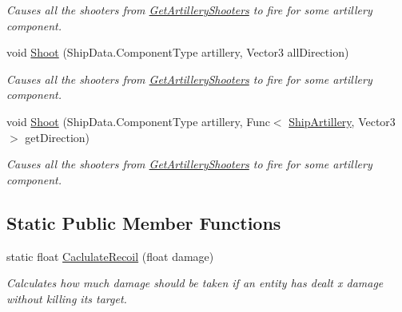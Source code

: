 \begin{DoxyCompactItemize}
\begin{DoxyCompactList}\small\item\em Causes all the shooters from \hyperlink{class_skyrates_1_1_entity_1_1_entity_ship_a75c4b113dd48dba91c0abaaa1372ed1a}{Get\-Artillery\-Shooters} to fire for some artillery component. \end{DoxyCompactList}\item 
void \hyperlink{class_skyrates_1_1_entity_1_1_entity_ship_a5a6db8ceccf49166e10794393d5100a4}{Shoot} (Ship\-Data.\-Component\-Type artillery, Vector3 all\-Direction)
\begin{DoxyCompactList}\small\item\em Causes all the shooters from \hyperlink{class_skyrates_1_1_entity_1_1_entity_ship_a75c4b113dd48dba91c0abaaa1372ed1a}{Get\-Artillery\-Shooters} to fire for some artillery component. \end{DoxyCompactList}\item 
void \hyperlink{class_skyrates_1_1_entity_1_1_entity_ship_a53c071ec06053fda9744f40cfa1e2481}{Shoot} (Ship\-Data.\-Component\-Type artillery, Func$<$ \hyperlink{class_skyrates_1_1_ship_1_1_ship_artillery}{Ship\-Artillery}, Vector3 $>$ get\-Direction)
\begin{DoxyCompactList}\small\item\em Causes all the shooters from \hyperlink{class_skyrates_1_1_entity_1_1_entity_ship_a75c4b113dd48dba91c0abaaa1372ed1a}{Get\-Artillery\-Shooters} to fire for some artillery component. \end{DoxyCompactList}\end{DoxyCompactItemize}
\subsection*{Static Public Member Functions}
\begin{DoxyCompactItemize}
\item 
static float \hyperlink{class_skyrates_1_1_entity_1_1_entity_ship_a94df69121e4413a10add5c11b9bdc63b}{Caclulate\-Recoil} (float damage)
\begin{DoxyCompactList}\small\item\em Calculates how much damage should be taken if an entity has dealt x damage without killing its target. \end{DoxyCompactList}\end{DoxyCompactItemize}
